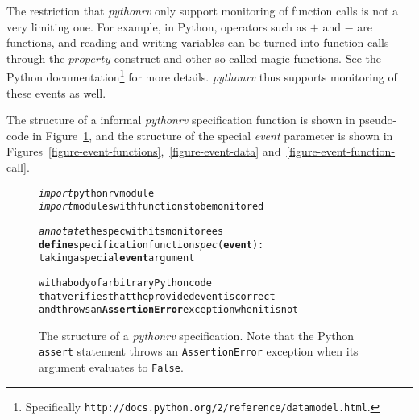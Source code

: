 \documentclass[a4paper,11pt]{kth-mag}
\theoremstyle{definition}
\begin{document}
The restriction that \textit{pythonrv} only support monitoring of function
calls is not a very limiting one. For example, in Python, operators such as $+$
and $-$ are functions, and reading and writing variables can be turned into
function calls through the $property$ construct and other so-called magic
functions. See the Python documentation\footnote{Specifically
\texttt{http://docs.python.org/2/reference/datamodel.html}.} for more details.
\textit{pythonrv} thus supports monitoring of these events as well.

The structure of a informal \textit{pythonrv} specification function is shown
in pseudo-code in Figure~\ref{figure-pseudo-spec}, and the structure of the
special \textit{event} parameter is shown in
Figures~\ref{figure-event-functions},~\ref{figure-event-data}
and~\ref{figure-event-function-call}.

\begin{figure}[h!]
	\begin{center}
	\begin{minipage}{0.7\textwidth}
    \begin{alltt}
\emph{import} pythonrv module
\emph{import} modules with functions to be monitored

\emph{annotate} the spec with its monitorees
\textbf{define} specification function \textit{spec}(\textbf{event}):
  taking a special \textbf{event} argument

  with a body of arbitrary Python code
  that verifies that the provided event is correct
  and throws an \textbf{AssertionError} exception when it is not
    \end{alltt}
	\end{minipage}
	\end{center}

  \caption{The structure of a \textit{pythonrv} specification. Note that the
    Python \texttt{assert} statement throws an \texttt{AssertionError}
    exception when its argument evaluates to \texttt{False}.}
	\label{figure-pseudo-spec}
\end{figure}
\end{document}
